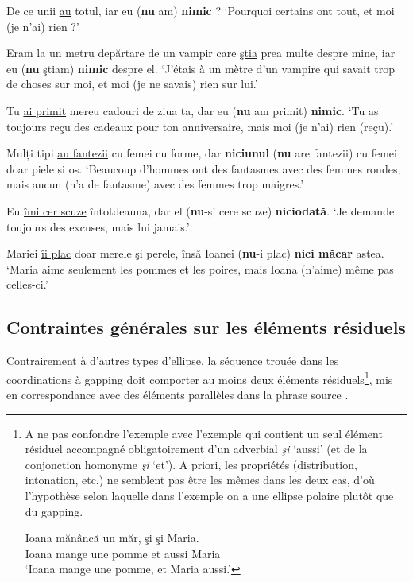 \ea \label{ch2:ex109}
\ea De ce unii \uline{au} totul, iar eu (\textbf{nu} am) \textbf{nimic} ?
\glt ‘Pourquoi certains ont tout, et moi (je n’ai) rien ?’

\ex  Eram la un metru depărtare de un vampir care \uline{ştia} prea multe despre mine, iar eu (\textbf{nu} ştiam) \textbf{nimic} despre el.
\glt ‘J’étais à un mètre d’un vampire qui savait trop de choses sur moi, et moi (je ne savais) rien sur lui.’ 

\ex Tu \uline{ai primit} mereu cadouri de ziua ta, dar eu (\textbf{nu} am primit) \textbf{nimic}.
\glt ‘Tu as toujours reçu des cadeaux pour ton anniversaire, mais moi (je n’ai) rien (reçu).’

\ex Mulți tipi \uline{au fantezii} cu femei cu forme, dar \textbf{niciunul} (\textbf{nu} are fantezii) cu femei doar piele și os.
\glt ‘Beaucoup d’hommes ont des fantasmes avec des femmes rondes, mais aucun (n’a de fantasme) avec des femmes trop maigres.’ 

\ex Eu \uline{îmi cer scuze} întotdeauna, dar el (\textbf{nu}-și cere scuze) \textbf{niciodată}.
\glt ‘Je demande toujours des excuses, mais lui jamais.’

\ex Mariei \uline{îi plac} doar merele şi perele, însă Ioanei (\textbf{nu}-i plac) \textbf{nici măcar} astea.
\glt ‘Maria aime seulement les pommes et les poires, mais Ioana (n’aime) même pas celles-ci.’ 
\z
\z


\subsection{Contraintes générales sur les éléments résiduels} \label{ch2:sect2.3.3}


Contrairement à d’autres types d’ellipse, la séquence trouée dans les coordinations à gapping doit comporter au moins deux éléments résiduels\footnote{
A ne pas confondre l’exemple  avec l’exemple  qui contient un seul élément résiduel accompagné obligatoirement d’un adverbial \textit{şi} ‘aussi’ (et de la conjonction homonyme \textit{şi} ‘et’). A priori, les propriétés (distribution, intonation, etc.) ne semblent pas être les mêmes dans les deux cas, d’où l’hypothèse selon laquelle dans l’exemple  on a une ellipse polaire plutôt que du gapping.
 
\ea 
\gll Ioana  mănâncă  un  măr,  şi  şi  Maria. \label{ch2:foot36i}\\
 Ioana  mange  une  pomme  et  aussi  Maria\\
\glt ‘Ioana mange une pomme, et Maria aussi.’
\z

}, mis en correspondance avec des éléments parallèles dans la phrase source .                      

